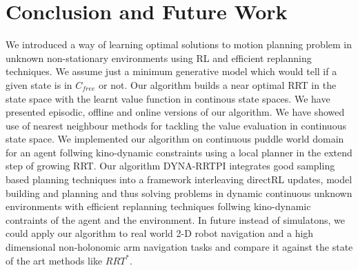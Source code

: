 \documentclass[MTech]{iitmdiss}
\begin{document}
\chapter{Conclusion and Future Work}
We introduced a way of learning optimal solutions to motion planning problem in unknown non-stationary environments using RL and efficient replanning techniques. We assume just a minimum generative model which would tell if a given state is in $C_{free}$ or not. Our algorithm builds a near optimal RRT in the state space with the learnt value function in continous state spaces. We have presented episodic, offline and online versions of our algorithm. We have showed use of nearest neighbour methods for tackling the value evaluation in continuous state space. We implemented our algorithm on continuous puddle world domain for an agent follwing kino-dynamic constraints using a local planner in the extend step of growing RRT. Our algorithm DYNA-RRTPI integrates good sampling based planning techniques into a framework interleaving directRL updates, model building and planning and thus solving problems in dynamic continuous unknown environments with efficient replanning techniques follwing kino-dynamic contraints of the agent and the environment. In future instead of simulatons, we could apply our algorithm to real world 2-D robot navigation and a high dimensional non-holonomic arm navigation tasks and compare it against the state of the art methods like $RRT^*$. 


%
\pagebreak
\begin{singlespace}
  \begin{small}
	
  \end{small}
\end{singlespace}

\end{document}

